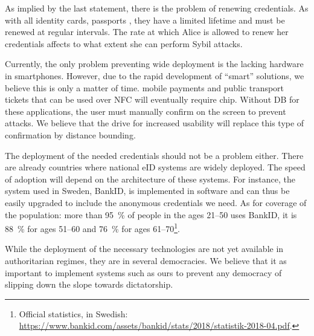 As implied by the last statement, there is the problem of renewing credentials.
As with all identity cards, passports \etc, they have a limited lifetime and 
must be renewed at regular intervals.
The rate at which Alice is allowed to renew her credentials affects to what 
extent she can perform Sybil attacks.

Currently, the only problem preventing wide deployment is the lacking hardware 
in smartphones.
However, due to the rapid development of \enquote{smart} solutions, we believe 
this is only a matter of time.
\Eg mobile payments and public transport tickets that can be used over \ac{NFC} 
will eventually require  chip.
Without \ac{DB} for these applications, the user must manually confirm on the 
screen to prevent attacks.
We believe that the drive for increased usability will replace this type of 
confirmation by distance bounding.

The deployment of the needed credentials should not be a problem either.
There are already countries where national \ac{eID} systems are widely deployed.
The speed of adoption will depend on the architecture of these systems.
For instance, the system used in Sweden, BankID, is implemented in software and 
can thus be easily upgraded to include the anonymous credentials we need.
As for coverage of the population: more than \SI{95}{\%} of people in the ages 
21--50 uses BankID, it is \SI{88}{\%} for ages 51--60 and \SI{76}{\%} for ages 
61--70\footnote{%
  Official statistics, in Swedish:
  \url{https://www.bankid.com/assets/bankid/stats/2018/statistik-2018-04.pdf}.
}.

While the deployment of the necessary technologies are not yet available in 
authoritarian regimes, they are in several democracies.
We believe that it as important to implement systems such as ours to prevent any 
democracy of slipping down the slope towards dictatorship.
